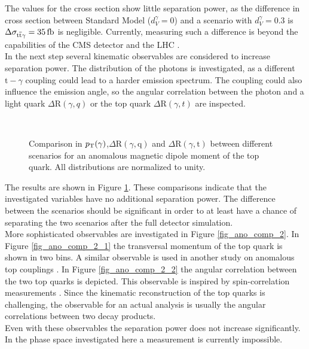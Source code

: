The values for the cross section show little separation power, as the difference in cross section between Standard Model ($d_V^{\gamma} = 0$)  and a scenario with $d_V^{\gamma} = 0.3$ is $\Delta \sigma_{\ttgamma} = \SI{35}{\femto \barn}$ is negligible. Currently, measuring such a difference is beyond the capabilities of the CMS detector and the LHC .\\
In the next step several kinematic observables are considered to increase separation power. The \pt distribution of the photons is investigated, as a different $\mathrm{t}-\gamma$ coupling could lead to a harder emission spectrum. The coupling could also influence the emission angle, so the angular correlation between the photon and a light quark $\Delta \mathrm{R} (\gamma,q)$ or the top quark $\Delta \mathrm{R} (\gamma,t)$ are inspected.

\begin{figure}[ht]
\centering
  \\
  \caption{Comparison in $p_{\mathrm{T}} (\gamma)$,$\Delta \mathrm{R} (\gamma, \mathrm{q})$ and $\Delta \mathrm{R} (\gamma, \mathrm{t})$ between different scenarios for an anomalous magnetic dipole moment of the top quark. All distributions are normalized to unity.}
  \label{fig_ano_comp_1}
\end{figure}

The results are shown in Figure \ref{fig_ano_comp_1}. These comparisons indicate that the investigated variables have no additional separation power.  The difference between the scenarios should be significant in order to at least have a chance of separating the two scenarios after the full detector simulation.\enlargethispage{\baselineskip}\\
\FloatBarrier
More sophisticated observables are investigated in Figure \ref{fig_ano_comp_2}. In Figure \ref{fig_ano_comp_2_1} the transversal momentum of the top quark is shown in two bins. A similar observable is used in another study on anomalous top couplings \cite{Backes}. In Figure \ref{fig_ano_comp_2_2} the angular correlation between the two top quarks is depicted. This observable is inspired by spin-correlation measurements \cite{CMS-PAS-TOP-12-004,Höhle:1349025}. Since the kinematic reconstruction of the top quarks is challenging, the observable for an actual analysis is usually the angular correlations between two decay products. \\
Even with these observables the separation power does not increase significantly. In the phase space investigated here a measurement is currently impossible.   

